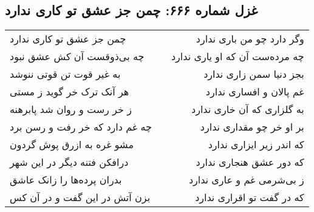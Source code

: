 \begin{center}
\section*{غزل شماره ۶۶۶: چمن جز عشق تو کاری ندارد}
\label{sec:0666}
\begin{longtable}{l p{0.5cm} r}
چمن جز عشق تو کاری ندارد
&&
وگر دارد چو من باری ندارد
\\
چه بی‌ذوقست آن کش عشق نبود
&&
چه مرده‌ست آن که او یاری ندارد
\\
به غیر قوت تن قوتی ننوشد
&&
بجز دنیا سمن زاری ندارد
\\
هر آنک ترک خر گوید ز مستی
&&
غم پالان و افساری ندارد
\\
ز خر رست و روان شد پابرهنه
&&
به گلزاری که آن خاری ندارد
\\
چه غم دارد که خر رفت و رسن برد
&&
بر او خر چو مقداری ندارد
\\
مشو غره به ازرق پوش گردون
&&
که اندر زیر ایزاری ندارد
\\
درافکن فتنه دیگر در این شهر
&&
که دور عشق هنجاری ندارد
\\
بدران پرده‌ها را زانک عاشق
&&
ز بی‌شرمی غم و عاری ندارد
\\
بزن آتش در این گفت و در آن کس
&&
که در گفت تو اقراری ندارد
\\
\end{longtable}
\end{center}
